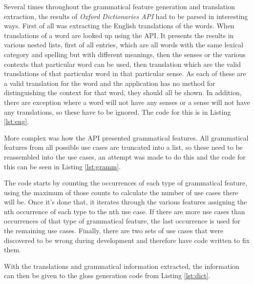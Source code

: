 Several times throughout the grammatical feature generation and translation extraction, the results of \textit{Oxford Dictionaries API} had to be parsed in interesting ways. First of all was extracting the English translations of the words. When translations of a word are looked up using the API. It presents the results in various nested lists, first of all entries, which are all words with the same lexical category and spelling but with different meanings, then the senses or the various contexts that particular word can be used, then translation which are the valid translations of that particular word in that particular sense. As each of these are a valid translation for the word and the application has no method for distinguishing the context for that word, they should all be shown. In addition, there are exception where a word will not have any senses or a sense will not have any translations, so these have to be ignored. The code for this is in Listing \ref{lst:eng}. 



More complex was how the API presented grammatical features. All grammatical features from all possible use cases are truncated into a list, so these need to be reassembled into the use cases, an attempt was made to do this and the code for this can be seen in Listing \ref{lst:gramm}.



The code starts by counting the occurrences of each type of grammatical feature, using the maximum of those counts to calculate the number of use cases there will be. Once it's done that, it iterates through the various features assigning the nth occurrence of each type to the nth use case. If there are more use cases than occurrences of that type of grammatical feature, the last occurrence is used for the remaining use cases. Finally, there are two sets of use cases that were discovered to be wrong during development and therefore have code written to fix them. 

With the translations and grammatical information extracted, the information can then be given to the gloss generation code from Listing \ref{lst:dict}. 
